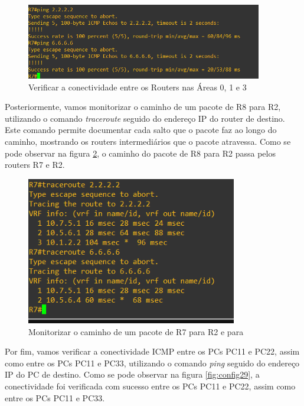 \documentclass[11pt,english, openright, oneside]{book}
\begin{document}
\begin{figure}[H]
    \centering
    \includegraphics[width=0.92\textwidth]{imagens/Tarefa3/16.ping_R7_R2_R6.png}
    \caption{Verificar a conectividade entre os Routers nas Áreas 0, 1 e 3}
    \label{fig:config27}
\end{figure}
\vspace{0.2cm}

\par Posteriormente, vamos monitorizar o caminho de um pacote de R8 para R2, utilizando o comando \textit{traceroute} seguido do endereço IP do router de destino. Este comando permite documentar cada salto que o pacote faz ao longo do caminho, mostrando os routers intermediários que o pacote atravessa. Como se pode observar na figura \ref{fig:config28}, o caminho do pacote de R8 para R2 passa pelos routers R7 e R2.

\begin{figure}[H]
    \centering
    \includegraphics[width=0.82\textwidth]{imagens/Tarefa3/16.traceroute_R7_R2_R6.png}
    \caption{Monitorizar o caminho de um pacote de R7 para R2 e para }
    \label{fig:config28}
\end{figure}
\vspace{0.2cm}

\newpage
\par Por fim, vamos verificar a conectividade ICMP entre os PCs PC11 e PC22, assim como entre os PCs PC11 e PC33, utilizando o comando \textit{ping} seguido do endereço IP do PC de destino. Como se pode observar na figura \ref{fig:config29}, a conectividade foi verificada com sucesso entre os PCs PC11 e PC22, assim como entre os PCs PC11 e PC33.
\vspace{0.2cm}
\end{document}
